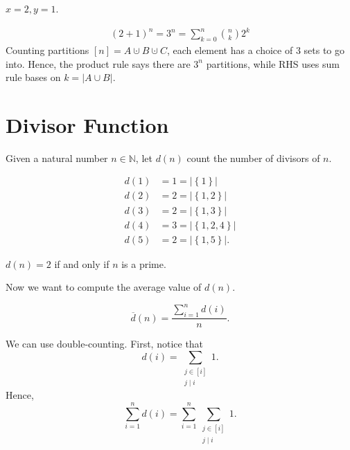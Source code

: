 \begin{eg}
    \(x=2, y=1\). 
\end{eg}
\begin{explanation}
    \begin{align*}
       (2 + 1)^n = 3^n = \sum_{k=0}^n \binom{n}{k} 2^k 
    \end{align*}
    Counting partitions \([n] = A \cupdot B \cupdot C\), each element has a choice of \(3\) sets to go into. Hence, the product rule says there are \(3^n\) partitions, while RHS uses sum rule bases on \(k = \vert A \cup B \vert \).    
\end{explanation}

\section{Divisor Function}
\begin{definition} \label{def: divisor func}
    Given a natural number \(n \in \mathbb{N} \), let \(d(n)\) count the number of divisors of \(n\).   
\end{definition}

\begin{eg}
    \begin{align*}
        d(1) &= 1 = \vert \left\{ 1 \right\}  \vert \\
        d(2) &= 2 = \vert \left\{ 1,2 \right\}  \vert \\
        d(3) &= 2 = \vert \left\{ 1, 3 \right\}  \vert   \\
        d(4) &= 3 = \vert \left\{ 1, 2, 4 \right\}  \vert \\
        d(5) &= 2 = \vert \left\{ 1, 5 \right\}  \vert.  
    \end{align*}
\end{eg}

\begin{corollary}
    \(d(n) = 2\) if and only if \(n\) is a prime.  
\end{corollary}

Now we want to compute the average value of \(d(n)\). 

\begin{definition}
    \[
        \overline{d}(n) = \frac{\sum_{i=1}^n d(i)}{n}.  
    \]
\end{definition}

We can use double-counting. First, notice that 
\[
    d(i) = \sum_{\substack{j \in [i] \\ j \mid i}} 1. 
\]
Hence, 
\[
    \sum_{i=1}^n d(i) = \sum_{i=1}^n \sum_{\substack{j \in [i] \\ j \mid i}} 1. 
\]

